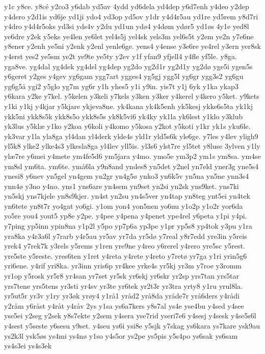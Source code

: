 {y1c
y8ce.
y8cé
y2co3
y6dab
yd5av
4ydd
yd6dela
yd4dep
y6d7enh
y4deo
y2dep
y4dero
y2d1is
yd6je
yd1ji
ydo4
yd3op
yd5ov
y1dr
y4d4r5au
yd1re
yd5rem
y8d7ri
y4dro
y4d4r5oks
yd3si
yds4v
y2du
yd1un
ydø4
y4døm
ydør5
yd1øs
4y1e
yed8l
ye6dre
y2ek
y5eks
ye4len
ye6let
yel4s5j
yel4sk
yels3m
yel6s5t
y2em
ye2n
y7e6ne
y8ener
y2enh
ye5ni
y2enk
y2enl
yenle6ge.
yens4
y4ense
y3e6re
ye4rel
y3ern
yer8sk
y4erst
yes2
ye5sm
ye2t
ye9te
ye5ty
y2ev
y1f
yfan9
yfjell4
y4fle
yf5le.
y8ga.
yga8ve.
yg4dal
yg4dek
yg4del
yg4dep
yg2do
yg2d1r
yg2d1y
yg2dø
yge5i
ygen5s
y6geret
y2ges
y4gev
yg6gam
ygg7art
ygges4
yg5gj
ygg5l
yg6gr
ygg3s2
yg6gu
yg6g5å
ygi2
y5glo
yg7m
yg6r
y1h
yhes5
y1i
y9in.
yis7t
y1j
6yk
y1ka
ykap3
y6kara
y2ke
y7kel.
y5kelen
y3keli
y7kels
y3ken
y3ker
y4kerel
y4kero
y5ket.
y9kets
y1ki
y1kj
y4kjar
y5kjare
ykjeva8ne.
yk4kana
yk4k5enh
yk5kesj
ykke6s5ta
yk1kj
ykk5ni
ykk8s5k
ykk8s5o
ykk8s5s
yk8k5vi6
yk4ky
yk1la
yk6lest
y1klo
y3klub
yk3lus
y5klæ
y1ko
y2koa
y6koli
y4komo
y5kosa
y2kot
y5koti
y1kr
yk1s
yku6le.
yk3var
y1la
yla8ga
yl4dan
yl4derk
ylde4s
yld1r
yld5s6k
yle6ge.
y7les
y4lev
yligh9
yl5k8
ylke2
ylke4s3
ylkesla8ga
yl4lev
yll5is.
yl3s6
ylst7re
yl5tet
y8luse
3ylven
y1ly
ylæ7re
y6mei
y4mete
ym4fe5d6
ym5jara
y4mo.
ymo5e
ym3p2
ym1s
ym8sa.
ym4se
ym8sl
ym6ta.
ym6te.
ymå6la
y9n8and
yndes8
yn5det
y2nel
yn7eld
yner3g
yne5s4
ynesi8
y6nev
yn5gel
yn4gem
yn2gr
yn4g5ø
ynko3
yn6k5v
yn5na
yn5ne
ynn3s4
ynn4ø
y3no
y4no.
yns1
yns6are
yn4sem
yn9set
yn2si
yn2sk
yns9ket.
yns7ki
yn5skj
yns7kjele
yn8s9kjer.
yn4st
yn2su
yn4s5ver
yn4tap
yn8teg
ynt5ei
yn4tek
yn6tete
yn8t7r
yo4gat
yo6gi.
y1om
yon4
yon5nen
yo6nu
y1o2p
y1o2r
yor6da
yo5re
you4
yout5
yp8e
y2pe.
y4pee
y4pena
y4penet
ype4rel
y6peta
y1pi
y4pi.
y7ping
yp5inn
ypin8na
y1p2l
y5po
yp7p6a
yp3pe
y1pr
yp5s8
yp4tok
y3pu
y1ra
yra8ka
y4r3a6l
y7rarb
y4r5au
yr5av
yr7da
yr5dø
y7real
y8r7edd
yre3in
y5reis
yrek4
y7rek7k
y3rels
y5rems
y1ren
yre9ne
y4reo
y6rerel
y4rero
yre5sc
y5rest.
yre5ste
y5reste.
yres6ten
y1ret
y4reta
y4rete
y4reto
y7retø
yr7ga
y1ri
yrin5g6
yri6ene.
y4rif
yri8ka.
yr3inn
yris6p
yr4kee
yrke4s
yr5kj
yr3m
y7roe
y3romm
yr1op
y5rosk
yr5r8
yr4san
yr7set
yr5sk
yr6skj
yr6skr
yr2sp
yrs7tan
yrs5tar
yrs7tene
yrs5tens
yr3sti
yr4sv
yr3te
yr6tek
yr2t3r
yr3tra
yrty8
y1ru
yrul8la.
yr5ut5r
yr3v
y1ry
yr3øk
yrøy4
y1rå1
yråd2
yrå8da
yråde7r
yrå6ders
y4rådi
y2råm
y6råst
y4råt
y4råv
2ys
y1sa
ys6a7kers
y8s7al
ys4e
yse4bu
y4sed
y4see
yse5ei
y2seg
y2sek
y8s7ekte
y2sem
y4sera
yse7rid
yseri7e6
y4sesj
y4sesk
y4se5s6l
y4sest
y5seste
y6sesu
y9set.
y4seu
ys6i
ysi8e
y5sjk
y7skag
ys6kara
ys7kare
ysk9au
ys2k3l
ysk5øs
ys4mi
ys4nø
y1so
y4s5or
ys2pe
ys5pis
y5s4po
ys6sak
ys6sam
ys4s3ei
ys4s3ek
}

